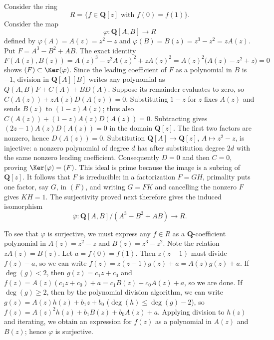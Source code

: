 \begin{example}
\label{example-affine-open-not-standard}
Consider the ring
$$
R = \{ f \in \mathbf{Q}[z]\text{ with }f(0) = f(1) \}.
$$
Consider the map
$$
\varphi : \mathbf{Q}[A, B] \to R
$$
defined by $\varphi(A)=A(z)=z^2-z$ and
$\varphi(B)=B(z)=z^3-z^2=zA(z)$.
Put $F=A^3-B^2+AB$. The exact identity
$$
F(A(z),B(z))=A(z)^3-z^2A(z)^2+zA(z)^2
=A(z)^2\bigl(A(z)-z^2+z\bigr)=0
$$
shows $(F)\subset\Ker(\varphi)$.
Since the leading coefficient of $F$ as a polynomial in $B$ is $-1$,
division in $\mathbf Q[A][B]$ writes any polynomial as
$Q(A,B)F+C(A)+BD(A)$.
Suppose its remainder evaluates to zero, so
$C(A(z))+zA(z)D(A(z))=0$.
Substituting $1-z$ for $z$ fixes $A(z)$ and sends $B(z)$ to
$(1-z)A(z)$; thus also $C(A(z))+(1-z)A(z)D(A(z))=0$.
Subtracting gives $(2z-1)A(z)D(A(z))=0$ in the domain $\mathbf Q[z]$.
The first two factors are nonzero, hence $D(A(z))=0$.
Substitution $\mathbf Q[A]\to\mathbf Q[z]$, $A\mapsto z^2-z$,
is injective: a nonzero polynomial of degree $d$ has after substitution
degree $2d$ with the same nonzero leading coefficient.
Consequently $D=0$ and then $C=0$, proving $\Ker(\varphi)=(F)$.
This ideal is prime because the image is a subring of $\mathbf Q[z]$.
It follows that $F$ is irreducible: in a factorization $F=GH$, primality
puts one factor, say $G$, in $(F)$, and writing $G=FK$ and cancelling
the nonzero $F$ gives $KH=1$.
The surjectivity proved next therefore gives the induced isomorphism
$$
\overline\varphi:\mathbf Q[A,B]/(A^3-B^2+AB)\longrightarrow R.
$$

\medskip\noindent
To see that $\varphi$ is surjective, we must express any
$f\in R$ as a $\mathbf{Q}$-coefficient polynomial in $A(z) = z^2-z$
and $B(z) = z^3-z^2$. Note the relation $zA(z) = B(z)$. Let
$a = f(0) = f(1)$. Then $z(z-1)$ must divide $f(z)-a$, so we can write
$f(z) = z(z-1)g(z)+a = A(z)g(z)+a$.  If $\deg(g) < 2$, then
$g(z) = c_1z + c_0$ and $f(z) = A(z)(c_1z + c_0)+a = c_1B(z)+c_0A(z)+a$, so we
are done.  If $\deg(g)\geq 2$, then by the polynomial division
algorithm, we can write $g(z) = A(z)h(z)+b_1z + b_0$
($\deg(h)\leq\deg(g)-2$), so $f(z) = A(z)^2h(z)+b_1B(z)+b_0A(z)+a$.
Applying division to $h(z)$ and iterating, we obtain an expression
for $f(z)$ as a polynomial in $A(z)$ and $B(z)$; hence $\varphi$ is
surjective.


\end{example}
